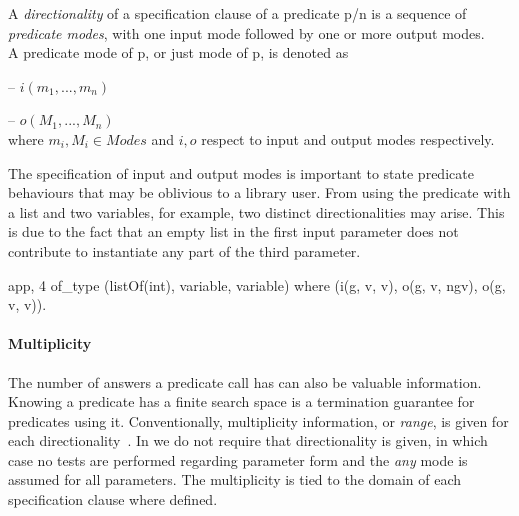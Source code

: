 \begin{definition}
\label{def:directionality}
A \emph{directionality} of a specification clause of a predicate
p/n is a sequence of \emph{predicate modes}, with one input mode
followed by one or more output modes.
\\
A predicate mode of p, or just mode of p, is denoted as

\;\;  -- $i(m_1, ..., m_n)$

\;\;  -- $o(M_1, ..., M_n)$
\\
where $m_i,M_i \in Modes$ and $i, o$ respect to input and output modes
respectively.
\end{definition}


The specification of input and output modes is important to state
predicate behaviours that may be oblivious to a library user.
%
From using the predicate  with a list and two variables, for
example, two distinct directionalities may arise.
%
This is due to the fact that an empty list in the first input parameter does
not contribute to instantiate any part of the third parameter.
%
\begin{yapcode}
 {app, 4} of_type (listOf(int), variable, variable)
    where (i(g, v, v), o(g, v, ngv), o(g, v, v)).
\end{yapcode}


\paragraph{\bf Multiplicity}
The number of answers a predicate call has can also be valuable
information.
%
Knowing a predicate has a finite search space is a termination
guarantee for predicates using it.
%
Conventionally, multiplicity information, or \emph{range}, is given for
each directionality~\cite{somogyi1995mercury}.
%
In \plqc{} we do not require that directionality is given, in which
case no tests are performed regarding parameter form and the \emph{any}
mode is assumed for all parameters.
%
The multiplicity is tied to the domain of each specification clause
where defined.


